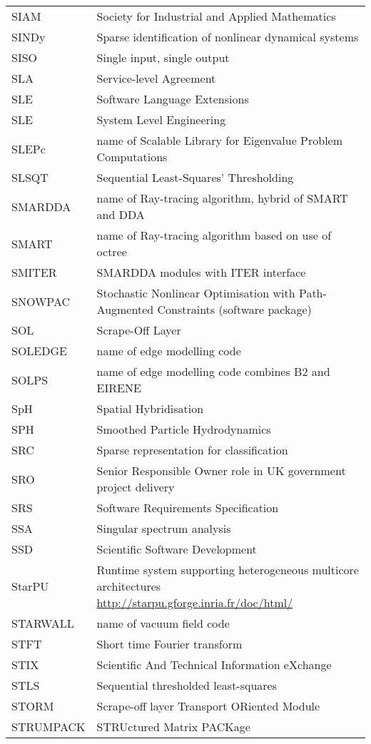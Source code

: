 \begin{longtable}{|p{4.0cm}|p{12.0cm}|}
SIAM & Society for Industrial and Applied Mathematics \\
SINDy  & Sparse identification of nonlinear dynamical systems \\
SISO  & Single input, single output \\
SLA & Service-level Agreement \\
SLE & Software Language Extensions \\
SLE & System Level Engineering \\
SLEPc & name of Scalable Library for Eigenvalue Problem Computations \\
SLSQT & Sequential Least-Squares' Thresholding \\
SMARDDA & name of Ray-tracing algorithm, hybrid of SMART and DDA \\
SMART & name of Ray-tracing algorithm based on use of octree\\
SMITER & SMARDDA modules with ITER interface \\
SNOWPAC & Stochastic Nonlinear Optimisation with Path-Augmented Constraints (software package) \\
SOL & Scrape-Off Layer \\
SOLEDGE & name of edge modelling code \\
SOLPS & name of edge modelling code combines B2 and EIRENE\\
SpH & Spatial Hybridisation \\
SPH & Smoothed Particle Hydrodynamics \\
SRC  & Sparse representation for classification \\
SRO & Senior Responsible Owner role in UK  government project delivery \\
SRS & Software Requirements Specification \\
SSA  & Singular spectrum analysis \\
SSD & Scientific Software Development \\
StarPU & Runtime system supporting heterogeneous multicore architectures \url{http://starpu.gforge.inria.fr/doc/html/} \\
STARWALL & name of vacuum field code \\
STFT  & Short time Fourier transform \\
STIX & Scientific And Technical Information eXchange \\
STLS  & Sequential thresholded least-squares \\
STORM & Scrape-off layer Transport ORiented Module \\
STRUMPACK & STRUctured Matrix PACKage \\

\end{longtable}
